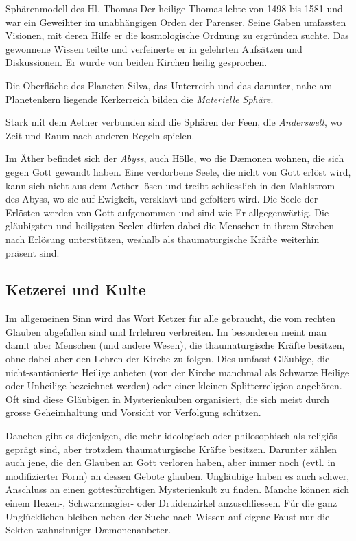 \documentclass[12pt,twoside,twocolumn,openany]{book}
\begin{document}
	\begin{paperbox}{Sphärenmodell des Hl. Thomas}
		Der heilige Thomas lebte von 1498 bis 1581 und war ein Geweihter im unabhängigen Orden der Parenser. Seine Gaben umfassten Visionen, mit deren Hilfe er die kosmologische Ordnung zu ergründen suchte. Das gewonnene Wissen teilte und verfeinerte er in gelehrten Aufsätzen und Diskussionen. Er wurde von beiden Kirchen heilig gesprochen.
		
		Die Oberfläche des Planeten Silva, das Unterreich und das darunter, nahe am Planetenkern liegende Kerkerreich bilden die \emph{Materielle Sphäre}.
		
		Stark mit dem Aether verbunden sind die Sphären der Feen, die \emph{Anderswelt}, wo Zeit und Raum nach anderen Regeln spielen.
		
		Im Äther befindet sich der \emph{Abyss}, auch Hölle, wo die D\ae monen wohnen, die sich gegen Gott gewandt haben. Eine verdorbene Seele, die nicht von Gott erlöst wird, kann sich nicht aus dem Aether lösen und treibt schliesslich in den Mahlstrom des Abyss, wo sie auf Ewigkeit, versklavt und gefoltert wird.
		Die Seele der Erlösten werden von Gott aufgenommen und sind wie Er allgegenwärtig. Die gläubigsten und heiligsten Seelen dürfen dabei die Menschen in ihrem Streben nach Erlösung unterstützen, weshalb als thaumaturgische Kräfte weiterhin präsent sind.
	\end{paperbox}

	\subsection{Ketzerei und Kulte}

	Im allgemeinen Sinn wird das Wort Ketzer für alle gebraucht, die vom rechten Glauben abgefallen sind und Irrlehren verbreiten. Im besonderen meint man damit aber Menschen (und andere Wesen), die thaumaturgische Kräfte besitzen, ohne dabei aber den Lehren der Kirche zu folgen. Dies umfasst Gläubige, die nicht-santionierte Heilige anbeten (von der Kirche manchmal als Schwarze Heilige oder Unheilige bezeichnet werden) oder einer kleinen Splitterreligion angehören. Oft sind diese Gläubigen in Mysterienkulten organisiert, die sich meist durch grosse Geheimhaltung und Vorsicht vor Verfolgung schützen.
	
	Daneben gibt es diejenigen, die mehr ideologisch oder philosophisch als religiös geprägt sind, aber trotzdem thaumaturgische Kräfte besitzen. Darunter zählen auch jene, die den Glauben an Gott verloren haben, aber immer noch (evtl. in modifizierter Form) an dessen Gebote glauben. Ungläubige haben es auch schwer, Anschluss an einen gottesfürchtigen Mysterienkult zu finden. Manche können sich einem Hexen-, Schwarzmagier- oder Druidenzirkel anzuschliessen. Für die ganz Unglücklichen bleiben neben der Suche nach Wissen auf eigene Faust nur die Sekten wahnsinniger D\ae monenanbeter.
	
\end{document}

